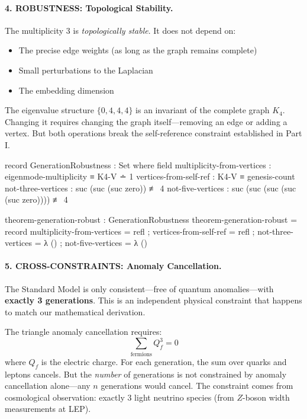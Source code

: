 \documentclass[11pt,a4paper]{book}
\begin{document}
\paragraph{4. ROBUSTNESS: Topological Stability.}

The multiplicity 3 is \emph{topologically stable}. It does not depend on:
\begin{itemize}
\item The precise edge weights (as long as the graph remains complete)
\item Small perturbations to the Laplacian
\item The embedding dimension
\end{itemize}

The eigenvalue structure $\{0, 4, 4, 4\}$ is an invariant of the complete graph $K_4$. Changing it requires changing the graph itself---removing an edge or adding a vertex. But both operations break the self-reference constraint established in Part I.

\begin{code}
record GenerationRobustness : Set where
  field
    multiplicity-from-vertices : eigenmode-multiplicity ≡ K4-V ∸ 1
    vertices-from-self-ref     : K4-V ≡ genesis-count
    not-three-vertices         : suc (suc (suc zero)) ≢ 4
    not-five-vertices          : suc (suc (suc (suc (suc zero)))) ≢ 4

theorem-generation-robust : GenerationRobustness
theorem-generation-robust = record
  { multiplicity-from-vertices = refl
  ; vertices-from-self-ref     = refl
  ; not-three-vertices         = λ ()
  ; not-five-vertices          = λ ()
  }
\end{code}

\paragraph{5. CROSS-CONSTRAINTS: Anomaly Cancellation.}

The Standard Model is only consistent---free of quantum anomalies---with \textbf{exactly 3 generations}. This is an independent physical constraint that happens to match our mathematical derivation.

The triangle anomaly cancellation requires:
\[
\sum_{\text{fermions}} Q_f^3 = 0
\]
where $Q_f$ is the electric charge. For each generation, the sum over quarks and leptons cancels. But the \emph{number} of generations is not constrained by anomaly cancellation alone---any $n$ generations would cancel. The constraint comes from cosmological observation: exactly 3 light neutrino species (from $Z$-boson width measurements at LEP).
\end{document}
